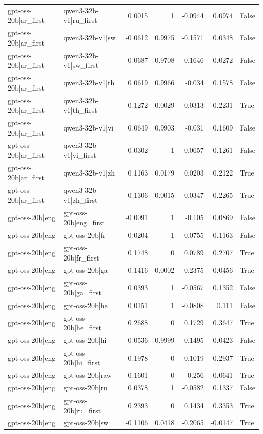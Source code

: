 \begin{table}
\begin{tabular}{l l r r r r l}
gpt-oss-20b|ar_first & qwen3-32b-v1|ru_first & 0.0015 & 1 & -0.0944 & 0.0974 & False \\
gpt-oss-20b|ar_first & qwen3-32b-v1|sw & -0.0612 & 0.9975 & -0.1571 & 0.0348 & False \\
gpt-oss-20b|ar_first & qwen3-32b-v1|sw_first & -0.0687 & 0.9708 & -0.1646 & 0.0272 & False \\
gpt-oss-20b|ar_first & qwen3-32b-v1|th & 0.0619 & 0.9966 & -0.034 & 0.1578 & False \\
gpt-oss-20b|ar_first & qwen3-32b-v1|th_first & 0.1272 & 0.0029 & 0.0313 & 0.2231 & True \\
gpt-oss-20b|ar_first & qwen3-32b-v1|vi & 0.0649 & 0.9903 & -0.031 & 0.1609 & False \\
gpt-oss-20b|ar_first & qwen3-32b-v1|vi_first & 0.0302 & 1 & -0.0657 & 0.1261 & False \\
gpt-oss-20b|ar_first & qwen3-32b-v1|zh & 0.1163 & 0.0179 & 0.0203 & 0.2122 & True \\
gpt-oss-20b|ar_first & qwen3-32b-v1|zh_first & 0.1306 & 0.0015 & 0.0347 & 0.2265 & True \\
gpt-oss-20b|eng & gpt-oss-20b|eng_first & -0.0091 & 1 & -0.105 & 0.0869 & False \\
gpt-oss-20b|eng & gpt-oss-20b|fr & 0.0204 & 1 & -0.0755 & 0.1163 & False \\
gpt-oss-20b|eng & gpt-oss-20b|fr_first & 0.1748 & 0 & 0.0789 & 0.2707 & True \\
gpt-oss-20b|eng & gpt-oss-20b|ga & -0.1416 & 0.0002 & -0.2375 & -0.0456 & True \\
gpt-oss-20b|eng & gpt-oss-20b|ga_first & 0.0393 & 1 & -0.0567 & 0.1352 & False \\
gpt-oss-20b|eng & gpt-oss-20b|he & 0.0151 & 1 & -0.0808 & 0.111 & False \\
gpt-oss-20b|eng & gpt-oss-20b|he_first & 0.2688 & 0 & 0.1729 & 0.3647 & True \\
gpt-oss-20b|eng & gpt-oss-20b|hi & -0.0536 & 0.9999 & -0.1495 & 0.0423 & False \\
gpt-oss-20b|eng & gpt-oss-20b|hi_first & 0.1978 & 0 & 0.1019 & 0.2937 & True \\
gpt-oss-20b|eng & gpt-oss-20b|raw & -0.1601 & 0 & -0.256 & -0.0641 & True \\
gpt-oss-20b|eng & gpt-oss-20b|ru & 0.0378 & 1 & -0.0582 & 0.1337 & False \\
gpt-oss-20b|eng & gpt-oss-20b|ru_first & 0.2393 & 0 & 0.1434 & 0.3353 & True \\
gpt-oss-20b|eng & gpt-oss-20b|sw & -0.1106 & 0.0418 & -0.2065 & -0.0147 & True \\

\end{tabular}
\end{table}
